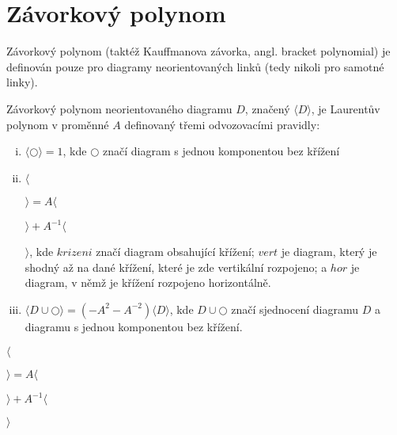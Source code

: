 \section{Závorkový polynom}
Závorkový polynom (taktéž Kauffmanova závorka, angl. bracket polynomial) je definován pouze pro diagramy neorientovaných linků (tedy nikoli pro samotné linky). 

\begin{definice}\label{def01:2}
Závorkový polynom neorientovaného diagramu $D$, značený $\langle D \rangle$, je Laurentův polynom v proměnné $A$ definovaný třemi odvozovacími pravidly:
\begin{enumerate}[i.]
\item
$ \langle \bigcirc  \rangle = 1$, kde $\bigcirc$ značí diagram s jednou komponentou bez křížení
\item
$ \langle$ 
$\rangle = A  \langle $
$ \rangle + A^{-1}  \langle $
$\rangle $, kde $krizeni$ značí diagram obsahující křížení; $vert$ je diagram, který je shodný až na dané křížení, které je zde vertikální rozpojeno; a $hor$ je diagram, v němž je křížení rozpojeno horizontálně.
\item
$ \langle D \cup \bigcirc \rangle = (-A^2 - A^{-2}) \langle D \rangle$, kde $D \cup \bigcirc $ značí sjednocení diagramu $D$ a diagramu s jednou komponentou bez křížení.
\end{enumerate}


\end{definice}

\begin{dusl}
$ \langle $ 
$ \rangle = A  \langle $
$ \rangle + A^{-1}  \langle $
$ \rangle $
\end{dusl}





